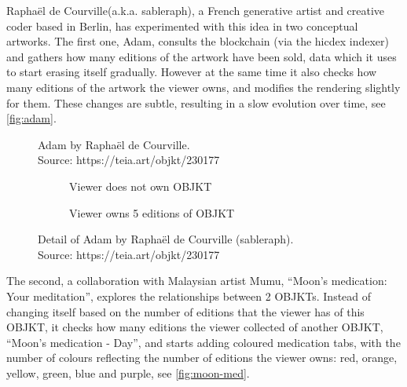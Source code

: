 Raphaël de Courville\footnotemark[7] (a.k.a. sableraph), a French generative artist and creative coder based in Berlin, has experimented with this idea in two conceptual artworks. The first one, Adam, consults the blockchain (via the hicdex indexer) and gathers how many editions of the artwork have been sold, data which it uses to start erasing itself gradually. However at the same time it also checks how many editions of the artwork the viewer owns, and modifies the rendering slightly for them. These changes are subtle, resulting in a slow evolution over time, see \autoref{fig:adam}.


\begin{figure}[h]
    \centering
    \captionsetup{justification=centering}
    \captionsetup{justification=centering}
    \caption[Adam by Raphaël de Courville]{Adam by Raphaël de Courville. \\ Source: https://teia.art/objkt/230177}
    \label{fig:adam}
\end{figure}


\begin{figure}[H]
  \centering
  \captionsetup{justification=centering}
  \begin{subfigure}[b]{0.45\textwidth}
    \centering
    \caption{Viewer does not own OBJKT}
    \label{fig:adam-no-own}
  \end{subfigure}
  \hfill
  \begin{subfigure}[b]{0.45\textwidth}
    \centering
    \caption{Viewer owns 5 editions of OBJKT}
    \label{fig:adam-own}
  \end{subfigure}
  \caption[Detail of Adam by Raphaël de Courville (sableraph)]{Detail of Adam by Raphaël de Courville (sableraph). \\ Source: https://teia.art/objkt/230177}
  \label{fig:adam-detail}
\end{figure}

The second, a collaboration with Malaysian artist Mumu\footnotemark[8], ``Moon's medication: Your meditation'', explores the relationships between 2 OBJKTs. Instead of changing itself based on the number of editions that the viewer has of this OBJKT, it checks how many editions the viewer collected of another OBJKT, ``Moon's medication - Day'', and starts adding coloured medication tabs, with the number of colours reflecting the number of editions the viewer owns: red, orange, yellow, green, blue and purple, see \autoref{fig:moon-med}.

